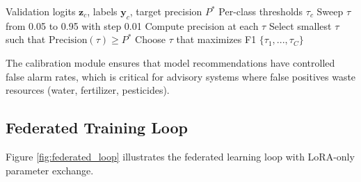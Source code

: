 \documentclass[10pt,journal,compsoc]{IEEEtran}
\begin{document}
\begin{algorithm}[!t]
\caption{Precision-Targeted Calibration}
\label{alg:calibration}
\begin{algorithmic}[1]
\REQUIRE Validation logits $\mathbf{z}_c$, labels $\mathbf{y}_c$, target precision $P^*$
\ENSURE Per-class thresholds $\tau_c$
    \STATE Sweep $\tau$ from 0.05 to 0.95 with step 0.01
    \STATE Compute precision at each $\tau$
    \STATE Select smallest $\tau$ such that $\text{Precision}(\tau) \geq P^*$
        \STATE Choose $\tau$ that maximizes F1
    \ENDIF
\ENDFOR
\RETURN $\{\tau_1, ..., \tau_C\}$
\end{algorithmic}
\end{algorithm}

The calibration module ensures that model recommendations have controlled false alarm rates, which is critical for advisory systems where false positives waste resources (water, fertilizer, pesticides).

\subsection{Federated Training Loop}

Figure \ref{fig:federated_loop} illustrates the federated learning loop with LoRA-only parameter exchange.
\end{document}
